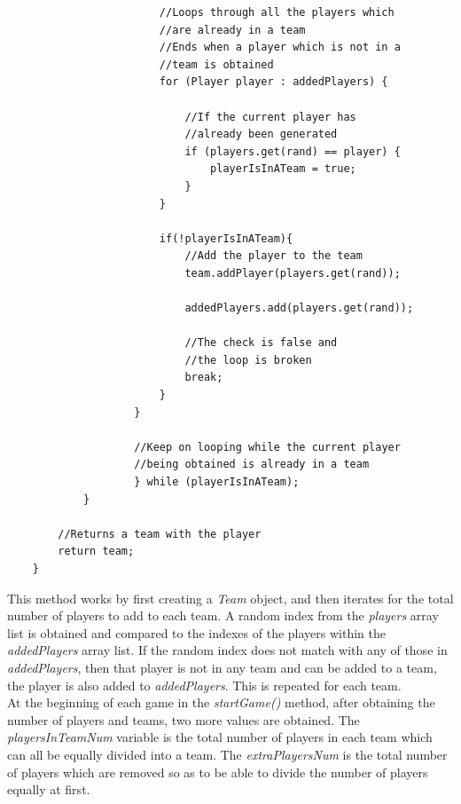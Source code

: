 \documentclass[a4paper,12pt]{extarticle}
\begin{document}
\begin{lstlisting}
                        //Loops through all the players which 
                        //are already in a team
                        //Ends when a player which is not in a 
                        //team is obtained
                        for (Player player : addedPlayers) {

                            //If the current player has 
                            //already been generated
                            if (players.get(rand) == player) {
                                playerIsInATeam = true;
                            }
                        }

                        if(!playerIsInATeam){
                            //Add the player to the team
                            team.addPlayer(players.get(rand));

                            addedPlayers.add(players.get(rand));

                            //The check is false and 
                            //the loop is broken
                            break;
                        }
                    }

                    //Keep on looping while the current player 
                    //being obtained is already in a team
                    } while (playerIsInATeam);
            }

        //Returns a team with the player
        return team;
    }
\end{lstlisting}
\vspace{4mm}

\noindent This method works by first creating a \textit{Team} object, and then iterates for the total number of players to add to each team. A random index from the \textit{players} array list is obtained and compared to the indexes of the players within the \textit{addedPlayers} array list. If the random index does not match with any of those in \textit{addedPlayers}, then that player is not in any team and can be added to a team, the player is also added to \textit{addedPlayers}. This is repeated for each team.\\

\noindent At the beginning of each game in the \textit{startGame()} method, after obtaining the number of players and teams, two more values are obtained. The \textit{playersInTeamNum} variable is the total number of players in each team which can all be equally divided into a team. The \textit{extraPlayersNum} is the total number of players which are removed so as to be able to divide the number of players equally at first. 
\end{document}
